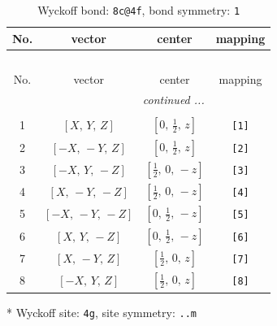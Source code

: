 \documentclass[fleqn,8pt]{jsarticle}
\begin{document}
\renewcommand{\arraystretch}{1.2}
\begin{longtable}{cccc}
\caption{Wyckoff bond: {\tt 8c@4f}, bond symmetry: {\tt 1}}
 \\
 \hline \hline
No. & vector & center & mapping \\ \hline \endfirsthead

\multicolumn{3}{l}{\tablename\ \thetable{}} \\
 \hline \hline
No. & vector & center & mapping \\ \hline \endhead

 \hline \hline
\multicolumn{3}{r}{\footnotesize\it continued ...} \\ \endfoot

 \hline \hline
\multicolumn{3}{r}{} \\ \endlastfoot

1 & $\left[ X,\, Y,\, Z \right]$ & $\left[ 0,\, \frac{1}{2},\, z \right]$ & {\tt [1]} \\ \hline
2 & $\left[ - X,\, - Y,\, Z \right]$ & $\left[ 0,\, \frac{1}{2},\, z \right]$ & {\tt [2]} \\ \hline
3 & $\left[ - X,\, Y,\, - Z \right]$ & $\left[ \frac{1}{2},\, 0,\, - z \right]$ & {\tt [3]} \\ \hline
4 & $\left[ X,\, - Y,\, - Z \right]$ & $\left[ \frac{1}{2},\, 0,\, - z \right]$ & {\tt [4]} \\ \hline
5 & $\left[ - X,\, - Y,\, - Z \right]$ & $\left[ 0,\, \frac{1}{2},\, - z \right]$ & {\tt [5]} \\ \hline
6 & $\left[ X,\, Y,\, - Z \right]$ & $\left[ 0,\, \frac{1}{2},\, - z \right]$ & {\tt [6]} \\ \hline
7 & $\left[ X,\, - Y,\, Z \right]$ & $\left[ \frac{1}{2},\, 0,\, z \right]$ & {\tt [7]} \\ \hline
8 & $\left[ - X,\, Y,\, Z \right]$ & $\left[ \frac{1}{2},\, 0,\, z \right]$ & {\tt [8]} \\
\end{longtable}
* Wyckoff site: {\tt 4g}, site symmetry: {\tt ..m}
\renewcommand{\arraystretch}{1.2}
\end{document}
